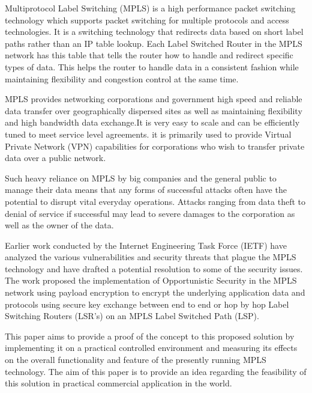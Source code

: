 \documentclass[a4paper, 12pt, oneside]{report}         %
\begin{document}
\begin{thesisabstract}                          %

Multiprotocol Label Switching (MPLS) is a high performance packet switching technology which supports packet switching for multiple protocols and access technologies. It is a switching technology that redirects data based on short label paths rather than an IP table lookup. Each Label Switched Router in the MPLS network has this table that tells the router how to handle and redirect specific types of data. This helps the router to handle data in a consistent fashion while maintaining flexibility and congestion control at the same time.

MPLS provides networking corporations and government high speed and reliable data transfer over geographically dispersed sites as well as maintaining flexibility and high bandwidth data exchange.It is very easy to scale and can be efficiently tuned to meet service level agreements. it is primarily used to provide Virtual Private Network (VPN) capabilities for corporations who wish to transfer private data over a public network.

Such heavy reliance on MPLS by big companies and the general public to manage their data means that any forms of successful attacks often have the potential to disrupt vital everyday operations. Attacks ranging from data theft to denial of service if successful may lead to severe damages to the corporation as well as the owner of the data.

Earlier work conducted by the Internet Engineering Task Force (IETF) have analyzed the various vulnerabilities and security threats that plague the MPLS technology and have drafted a potential resolution to some of the security issues. The work proposed the implementation of Opportunistic Security in the MPLS network using payload encryption to encrypt the underlying application data and protocols using secure key exchange between end to end or hop by hop Label Switching Routers (LSR's) on an MPLS Label Switched Path (LSP).

This paper aims to provide a proof of the concept to this proposed solution by implementing it on a practical controlled environment and measuring its effects on the overall functionality and feature of the presently running MPLS technology. The aim of this paper is to provide an idea regarding the feasibility of this solution in practical commercial application in the world.  
\end{thesisabstract}
\end{document}
